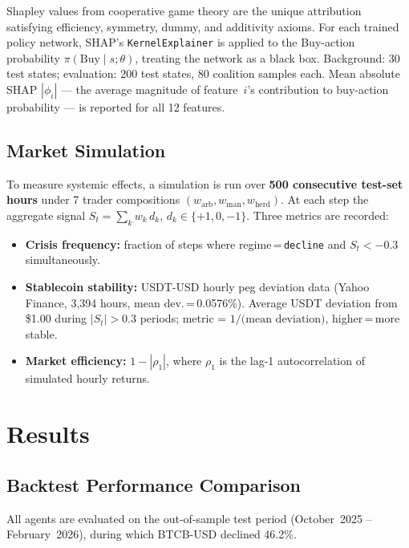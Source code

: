 \documentclass[11pt,a4paper]{article}
\begin{document}
Shapley values from cooperative game theory are the unique attribution satisfying efficiency, symmetry, dummy, and additivity axioms. For each trained policy network, SHAP's \texttt{KernelExplainer} is applied to the Buy-action probability $\pi(\text{Buy}\mid s;\theta)$, treating the network as a black box. Background: 30 test states; evaluation: 200 test states, 80 coalition samples each. Mean absolute SHAP $|\phi_i|$ --- the average magnitude of feature~$i$'s contribution to buy-action probability --- is reported for all 12 features.

\subsection{Market Simulation}

\sloppy
To measure systemic effects, a simulation is run over \textbf{500 consecutive test-set hours} under 7 trader compositions $(w_{\text{arb}},w_{\text{man}},w_{\text{herd}})$. At each step the aggregate signal $S_t = \sum_k w_k\,d_k$, $d_k\in\{+1,0,-1\}$. Three metrics are recorded:
\fussy

\begin{itemize}[nosep]
  \item \textbf{Crisis frequency:} fraction of steps where regime\,=\,\texttt{decline} and $S_t < -0.3$ simultaneously.
  \item \textbf{Stablecoin stability:} USDT-USD hourly peg deviation data (Yahoo Finance, 3{,}394 hours, mean dev.\,=\,0.0576\%). Average USDT deviation from \$1.00 during $|S_t|>0.3$ periods; metric = $1/\text{(mean deviation)}$, higher\,=\,more stable.
  \item \textbf{Market efficiency:} $1 - |\rho_1|$, where $\rho_1$ is the lag-1 autocorrelation of simulated hourly returns.
\end{itemize}

\section{Results}

\subsection{Backtest Performance Comparison}

All agents are evaluated on the out-of-sample test period (October~2025 -- February~2026), during which BTCB-USD declined 46.2\%.
\end{document}
